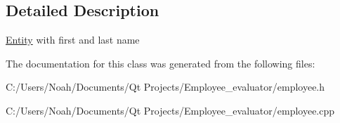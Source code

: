 \subsection{Detailed Description}
\hyperlink{class_entity}{Entity} with first and last name 

The documentation for this class was generated from the following files\-:\begin{DoxyCompactItemize}
\item 
C\-:/\-Users/\-Noah/\-Documents/\-Qt Projects/\-Employee\-\_\-evaluator/employee.\-h\item 
C\-:/\-Users/\-Noah/\-Documents/\-Qt Projects/\-Employee\-\_\-evaluator/employee.\-cpp\end{DoxyCompactItemize}
